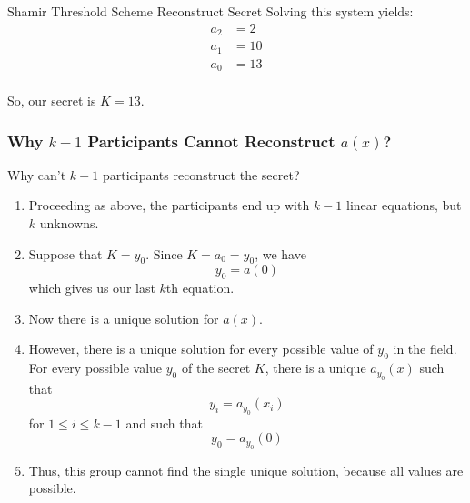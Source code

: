 \begin{example}{Shamir Threshold Scheme Reconstruct Secret}
  Solving this system yields:
  \begin{align*}
    a_{2} &= 2 \\
    a_{1} &= 10 \\
    a_{0} &= 13 \\
  \end{align*}

  So, our secret is $K=13$.
\end{example}

\subsubsection{\texorpdfstring{Why $k-1$ Participants Cannot Reconstruct $a(x)$?}{Fail to Reconstruct Secret}}\label{subsubsec:Fail_Reconstruct_Secret}
Why can't $k-1$ participants reconstruct the secret?
\begin{enumerate}[noitemsep]
\item Proceeding as above, the participants end up with $k-1$ linear equations, but $k$ unknowns.
\item Suppose that $K=y_{0}$. Since $K=a_{0}=y_{0}$, we have
  \begin{equation*}
    y_{0} = a(0)
  \end{equation*}
  which gives us our last $k$th equation.
\item Now there is a unique solution for $a(x)$.
\item However, there is a unique solution for every possible value of $y_{0}$ in the field.
  For every possible value $y_{0}$ of the secret $K$, there is a unique  $a_{y_{0}}(x)$ such that
  \begin{equation*}
    y_{i} = a_{y_{0}}(x_{i})
  \end{equation*}
  for $1 \leq i \leq k-1$ and such that
  \begin{equation*}
    y_{0} = a_{y_{0}}(0)
  \end{equation*}
\item Thus, this group cannot find the single unique solution, because all values are possible.
\end{enumerate}

